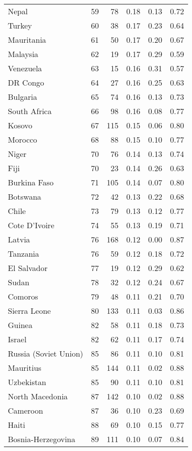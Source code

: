 \begin{longtable}[t]{lrrrrr}
Nepal & 59 & 78 & 0.18 & 0.13 & 0.72\\
Turkey & 60 & 38 & 0.17 & 0.23 & 0.64\\
\addlinespace
Mauritania & 61 & 50 & 0.17 & 0.20 & 0.67\\
Malaysia & 62 & 19 & 0.17 & 0.29 & 0.59\\
Venezuela & 63 & 15 & 0.16 & 0.31 & 0.57\\
DR Congo & 64 & 27 & 0.16 & 0.25 & 0.63\\
Bulgaria & 65 & 74 & 0.16 & 0.13 & 0.73\\
\addlinespace
South Africa & 66 & 98 & 0.16 & 0.08 & 0.77\\
Kosovo & 67 & 115 & 0.15 & 0.06 & 0.80\\
Morocco & 68 & 88 & 0.15 & 0.10 & 0.77\\
Niger & 70 & 76 & 0.14 & 0.13 & 0.74\\
Fiji & 70 & 23 & 0.14 & 0.26 & 0.63\\
\addlinespace
Burkina Faso & 71 & 105 & 0.14 & 0.07 & 0.80\\
Botswana & 72 & 42 & 0.13 & 0.22 & 0.68\\
Chile & 73 & 79 & 0.13 & 0.12 & 0.77\\
Cote D'Ivoire & 74 & 55 & 0.13 & 0.19 & 0.71\\
Latvia & 76 & 168 & 0.12 & 0.00 & 0.87\\
\addlinespace
Tanzania & 76 & 59 & 0.12 & 0.18 & 0.72\\
El Salvador & 77 & 19 & 0.12 & 0.29 & 0.62\\
Sudan & 78 & 32 & 0.12 & 0.24 & 0.67\\
Comoros & 79 & 48 & 0.11 & 0.21 & 0.70\\
Sierra Leone & 80 & 133 & 0.11 & 0.03 & 0.86\\
\addlinespace
Guinea & 82 & 58 & 0.11 & 0.18 & 0.73\\
Israel & 82 & 62 & 0.11 & 0.17 & 0.74\\
Russia (Soviet Union) & 85 & 86 & 0.11 & 0.10 & 0.81\\
Mauritius & 85 & 144 & 0.11 & 0.02 & 0.88\\
Uzbekistan & 85 & 90 & 0.11 & 0.10 & 0.81\\
\addlinespace
North Macedonia & 87 & 142 & 0.10 & 0.02 & 0.88\\
Cameroon & 87 & 36 & 0.10 & 0.23 & 0.69\\
Haiti & 88 & 69 & 0.10 & 0.15 & 0.77\\
Bosnia-Herzegovina & 89 & 111 & 0.10 & 0.07 & 0.84\\

\end{longtable}
